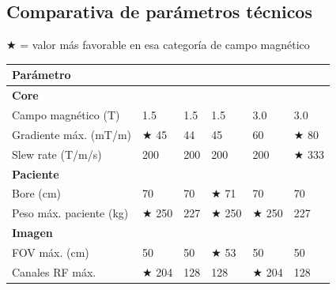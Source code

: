 \documentclass[11pt, a4paper]{article}
\begin{document}
\subsection{Comparativa de parámetros técnicos}

{\footnotesize $\bigstar$ = valor más favorable en esa categoría de campo magnético}

\vspace{4pt}
\begin{center}
\renewcommand{\arraystretch}{1.25}
\begin{tabular}{P{4.2cm} C{2cm} C{2cm} C{2cm} C{2cm} C{2cm}}
\toprule
{}
\textbf{\color{white}Parámetro} &
\textbf{\color{white}} &
\textbf{\color{white}} &
\textbf{\color{white}} &
\textbf{\color{white}} &
\textbf{\color{white}} \\
\midrule
{}\small\textbf{Core} & & & & & \\
Campo magnético (T)        & 1.5 & 1.5 & 1.5 & 3.0 & 3.0 \\
Gradiente máx. (mT/m)      & $\bigstar$ 45 & 44 & 45 & 60 & $\bigstar$ 80 \\
Slew rate (T/m/s)          & 200 & 200 & 200 & 200 & $\bigstar$ 333 \\
\small\textbf{Paciente} & & & & & \\
Bore (cm)                  & 70 & 70 & $\bigstar$ 71 & 70 & 70 \\
Peso máx. paciente (kg)    & $\bigstar$ 250 & 227 & $\bigstar$ 250 & $\bigstar$ 250 & 227 \\
\small\textbf{Imagen} & & & & & \\
FOV máx. (cm)              & 50 & 50 & $\bigstar$ 53 & 50 & 50 \\
Canales RF máx.            & $\bigstar$ 204 & 128 & 128 & $\bigstar$ 204 & 128 \\

\end{tabular}
\end{center}
\end{document}
